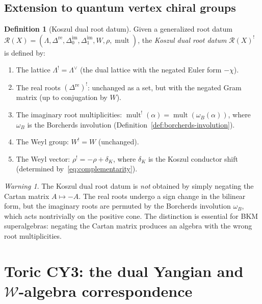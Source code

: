 \documentclass[11pt]{article}
\theoremstyle{definition}
\newtheorem{definition}[theorem]{Definition}
\theoremstyle{remark}
\newtheorem{warning}[theorem]{Warning}
\DeclareMathOperator{\mult}{mult}
\newcommand{\cR}{\mathcal{R}}
\newcommand{\cW}{\mathcal{W}}
\begin{document}
\subsection{Extension to quantum vertex chiral groups}

\begin{definition}[Koszul dual root datum]
\label{def:koszul-dual-root-datum}
Given a generalized root datum $\cR(X) = (\Lambda, \Delta^{\mathrm{re}},
\Delta^{\mathrm{im}}_0, \Delta^{\mathrm{im}}_1, W, \rho, \mult)$,
the \emph{Koszul dual root datum} $\cR(X)^!$ is defined by:
\begin{enumerate}[label=(\roman*)]
\item The lattice $\Lambda^! = \Lambda^\vee$ (the dual lattice with
the negated Euler form $-\chi$).
\item The real roots $(\Delta^{\mathrm{re}})^!$: unchanged as a set,
but with the negated Gram matrix (up to conjugation by $W$).
\item The imaginary root multiplicities: $\mult^!(\alpha) =
\mult(\omega_B(\alpha))$, where $\omega_B$ is the Borcherds involution
(Definition~\ref{def:borcherds-involution}).
\item The Weyl group: $W^! = W$ (unchanged).
\item The Weyl vector: $\rho^! = -\rho + \delta_K$, where $\delta_K$
is the Koszul conductor shift (determined by~\eqref{eq:complementarity}).
\end{enumerate}
\end{definition}

\begin{warning}
The Koszul dual root datum is \emph{not} obtained by simply negating
the Cartan matrix $A \mapsto -A$. The real roots undergo a sign change
in the bilinear form, but the imaginary roots are permuted by the
Borcherds involution $\omega_B$, which acts nontrivially on the
positive cone. The distinction is essential for BKM superalgebras:
negating the Cartan matrix produces an algebra with the wrong root
multiplicities.
\end{warning}


\section{Toric CY3: the dual Yangian and $\cW$-algebra correspondence}
\label{sec:toric}
\end{document}
